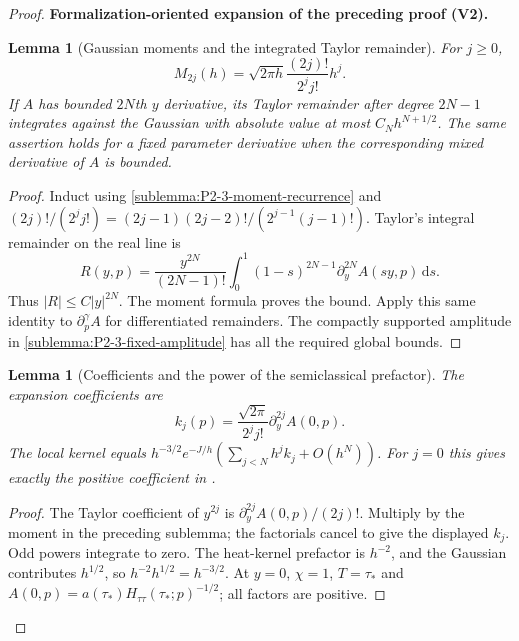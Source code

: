 \documentclass[11pt]{article}
\newtheorem{lemma}[theorem]{Lemma}
\newcommand{\formalisationparentid}{X}
\newenvironment{formalisationaddition}[1]{\par\medskip\begingroup\color{blue}\def\formalisationparentid{#1}\setcounter{formalizationsublemma}{0}\let\lemma\formalizationsublemma\let\endlemma\endformalizationsublemma
  \def\Eo{\mathcal E_h^\circ}\def\EE{\mathcal E_h}\def\phio{\phi_h^\circ}\def\phih{\phi_h}\def\Ho{H_h^{\rm atom}(v^\circ)}\def\Ha{H_h^{\rm atom}}\def\HL{H_h^{L}}\def\Dh{D_h}\def\Log{\operatorname{Log}}\def\ellh{\ell_h}\def\Gp{G_{p,h}}\def\Ast{A_{*,h}}\def\ahat{\widehat{\mathfrak a}_h}\def\ah{\mathfrak a_h}\def\rh{\widehat\rho_h}\def\deltah{\widehat\delta_h}\def\oldref##1{\textup{(##1)}}\def\interface##1{\par\noindent\textit{Analytical interface used here.} ##1\par}\def\finish{\par\noindent\textit{Conclusion of the formalization-oriented expansion.} }\par\noindent\textbf{Formalization-oriented expansion of the preceding proof (V2).}\par\smallskip
}{\par\endgroup\medskip
}
\begin{document}
\begin{proof}
\begin{formalisationaddition}{P2.3}
\begin{lemma}[Gaussian moments and the integrated Taylor remainder]\label{sublemma:P2-3-gaussian}
For $j\ge0$,
\[
 M_{2j}(h)=\sqrt{2\pi h}\frac{(2j)!}{2^jj!}h^j.
\]
If $A$ has bounded $2N$th $y$ derivative, its Taylor remainder after degree
$2N-1$ integrates against the Gaussian with absolute value at most
$C_N h^{N+1/2}$. The same assertion holds for a fixed parameter derivative
when the corresponding mixed derivative of $A$ is bounded.
\end{lemma}
\begin{proof}
Induct using \ref{sublemma:P2-3-moment-recurrence} and
$(2j)!/(2^jj!)=(2j-1)(2j-2)!/(2^{j-1}(j-1)!)$.
Taylor's integral remainder on the real line is
\[
 R(y,p)=\frac{y^{2N}}{(2N-1)!}\int_0^1(1-s)^{2N-1}
                   \partial_y^{2N}A(sy,p)\,\mathrm ds.
\]
Thus $|R|\le C|y|^{2N}$. The moment formula proves the bound.
Apply this same identity to $\partial_p^\gamma A$ for differentiated
remainders. The compactly supported amplitude in
\ref{sublemma:P2-3-fixed-amplitude} has all the required global bounds.
\end{proof}

\begin{lemma}[Coefficients and the power of the semiclassical prefactor]\label{sublemma:P2-3-coefficients}
The expansion coefficients are
\[
 k_j(p)=\frac{\sqrt{2\pi}}{2^jj!}\partial_y^{2j}A(0,p).
\]
The local kernel equals
$h^{-3/2}e^{-J/h}(\sum_{j<N}h^jk_j+O(h^N))$.
For $j=0$ this gives exactly the positive coefficient in .
\end{lemma}
\begin{proof}
The Taylor coefficient of $y^{2j}$ is
$\partial_y^{2j}A(0,p)/(2j)!$. Multiply by the moment in the preceding
sublemma; the factorials cancel to give the displayed $k_j$.
Odd powers integrate to zero. The heat-kernel prefactor is $h^{-2}$,
and the Gaussian contributes $h^{1/2}$, so $h^{-2}h^{1/2}=h^{-3/2}$.
At $y=0$, $\chi=1$, $T=\tau_*$ and
$A(0,p)=a(\tau_*)H_{\tau\tau}(\tau_*;p)^{-1/2}$; all factors are positive.
\end{proof}


\end{formalisationaddition}
\end{proof}
\end{document}
